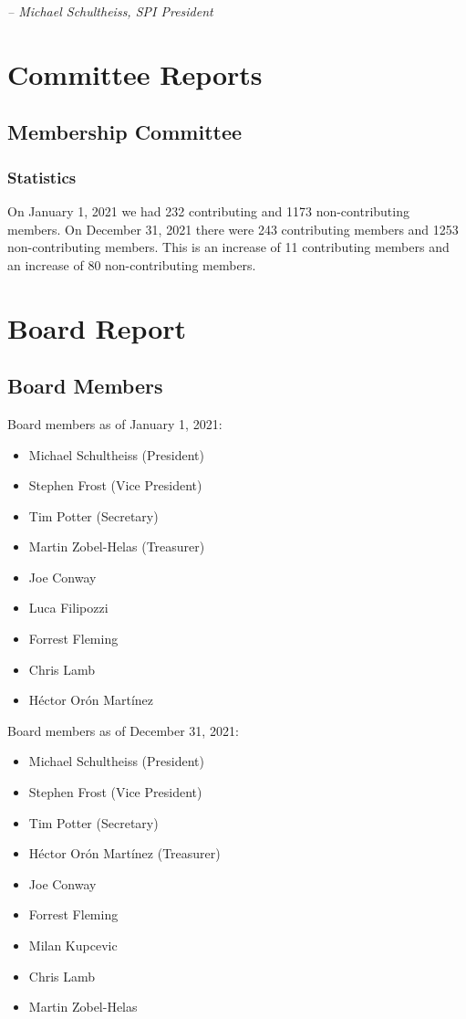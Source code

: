 \documentclass[a4paper]{report}
\begin{document}
  \emph{-- Michael Schultheiss, SPI President}

\chapter{Committee Reports}
\section{Membership Committee}

\subsection{Statistics}

On January 1, 2021 we had 232 contributing and 1173 non-contributing members.  On December 31, 2021 there were 243 contributing members and 1253 non-contributing members.  This is an increase of 11 contributing members and an increase of 80 non-contributing members.

\chapter{Board Report}
\section{Board Members}

Board members as of January 1, 2021:

\begin{itemize}
\item Michael Schultheiss (President)
\item Stephen Frost (Vice President)
\item Tim Potter (Secretary)
\item Martin Zobel-Helas (Treasurer)
\item Joe Conway
\item Luca Filipozzi
\item Forrest Fleming
\item Chris Lamb
\item Héctor Orón Martínez
\end{itemize}

Board members as of December 31, 2021:

\begin{itemize}
\item Michael Schultheiss (President)
\item Stephen Frost (Vice President)
\item Tim Potter (Secretary)
\item Héctor Orón Martínez (Treasurer)
\item Joe Conway
\item Forrest Fleming
\item Milan Kupcevic
\item Chris Lamb
\item Martin Zobel-Helas
\end{itemize}
\end{document}
